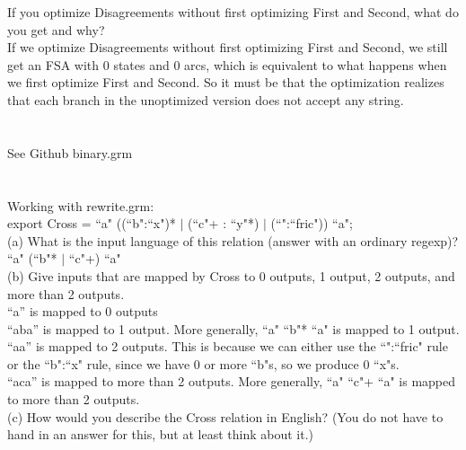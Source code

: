 \documentclass[11pt]{article} %
\begin{document}
If you optimize Disagreements without first optimizing First and Second, what do you get and why?\\


If we optimize Disagreements without first optimizing First and Second, we still get an FSA with 0 states and 0 arcs, which is equivalent to what happens when we first optimize First and Second. So it must be that the optimization realizes that each branch in the unoptimized version does not accept any string.\\


\section{}

See Github binary.grm\\

\newpage

\section{}

Working with rewrite.grm:\\


export Cross = ``a" ((``b":``x")* $|$ (``c"+ : ``y"*) $|$ (``":``fric")) ``a";\\


(a) What is the input language of this relation (answer with an ordinary regexp)? \\


``a" (``b"* $|$ ``c"+) ``a"\\


(b) Give inputs that are mapped by Cross to 0 outputs, 1 output, 2 outputs, and more than 2 outputs. \\

``a” is mapped to 0 outputs\\
``aba” is mapped to 1 output. More generally, ``a" ``b"* ``a" is mapped to 1 output.\\
``aa” is mapped to 2 outputs. This is because we can either use the ``":``fric" rule or the ``b":``x" rule, since we have 0 or more ``b"s, so we produce 0 ``x"s.\\
``aca” is mapped to more than 2 outputs. More generally, ``a" ``c"+ ``a" is mapped to more than 2 outputs.\\

(c) How would you describe the Cross relation in English? (You do not have to hand in an answer for this, but at least think about it.) \\
\end{document}
